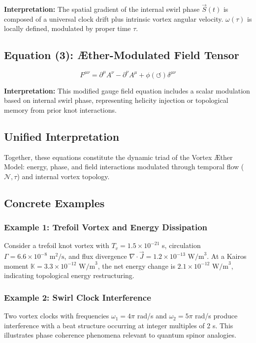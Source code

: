 \textbf{Interpretation:} The spatial gradient of the internal swirl phase $\vec{S}(t)$ is composed of a universal clock drift plus intrinsic vortex angular velocity. $\omega(\tau)$ is locally defined, modulated by proper time $\tau$.

\subsection*{Equation (3): Æther-Modulated Field Tensor}
\begin{equation}
    F^{\mu\nu} = \partial^\mu A^\nu - \partial^\nu A^\mu + \phi(\circlearrowleft) \delta^{\mu\nu}
\label{eq:Æther_modulated_field_tensor}
\end{equation}

\textbf{Interpretation:} This modified gauge field equation includes a scalar modulation based on internal swirl phase, representing helicity injection or topological memory from prior knot interactions.

\subsection*{Unified Interpretation}
Together, these equations constitute the dynamic triad of the Vortex Æther Model: energy, phase, and field interactions modulated through temporal flow ($\mathcal{N}, \tau$) and internal vortex topology.

\subsection*{Concrete Examples}

\subsubsection*{Example 1: Trefoil Vortex and Energy Dissipation}
Consider a trefoil knot vortex with $T_v = 1.5 \times 10^{-21}$ s, circulation $\Gamma = 6.6 \times 10^{-8} \text{ m}^2/\text{s}$, and flux divergence $\nabla \cdot \vec{J} = 1.2 \times 10^{-13} \text{ W/m}^3$. At a Kairos moment $\mathbb{K} = 3.3 \times 10^{-12} \text{ W/m}^3$, the net energy change is $2.1 \times 10^{-12} \text{ W/m}^3$, indicating topological energy restructuring.

\subsubsection*{Example 2: Swirl Clock Interference}
Two vortex clocks with frequencies $\omega_1 = 4\pi$ rad/s and $\omega_2 = 5\pi$ rad/s produce interference with a beat structure occurring at integer multiples of 2 s. This illustrates phase coherence phenomena relevant to quantum spinor analogies.


